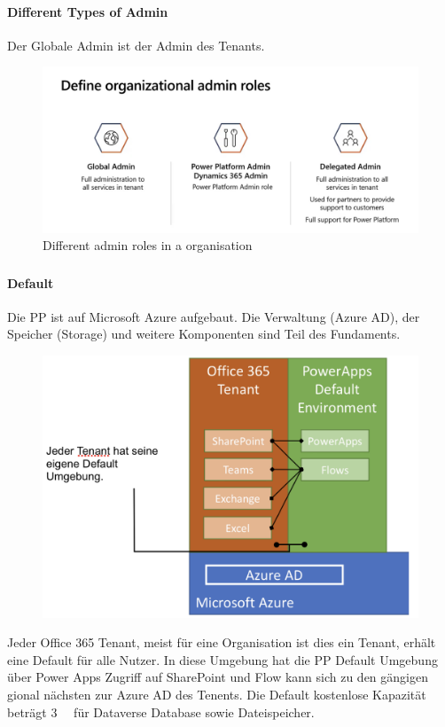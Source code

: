 \paragraph*{Different Types of Admin}
Der Globale Admin ist der Admin des Tenants.
\begin{figure}[H]
	\centering
	\includegraphics[scale = 0.3]{attachment/chapter_13/Scc001}
	\caption{Different admin roles in a organisation}
\end{figure}
\subsubsection{\Env}
\paragraph*{Default \Env}
Die \gls{PP} ist auf Microsoft Azure aufgebaut. Die Verwaltung (Azure AD), der Speicher (Storage) und weitere Komponenten sind Teil des Fundaments.
\begin{figure}[H]
	\centering
	\includegraphics[scale = 0.3]{attachment/chapter_13/Scc008}
\end{figure}
Jeder Office 365 Tenant, meist für eine Organisation ist dies ein Tenant, erhält eine Default \Env für alle Nutzer. In diese Umgebung hat die \gls{PP} Default Umgebung über Power Apps Zugriff auf SharePoint und Flow kann sich zu den gängigen gional nächsten zur Azure AD des Tenents. Die Default kostenlose Kapazität beträgt \SI{3}{\giga\byte} für Dataverse Database sowie Dateispeicher. \\

